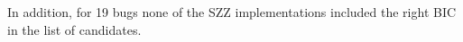 In addition, for 19 bugs none of the SZZ implementations included the right BIC in the list of candidates. 
